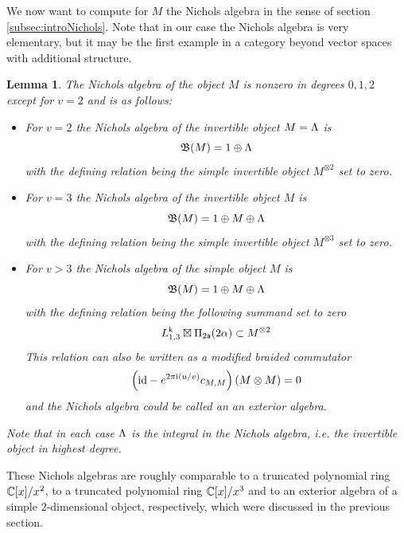 \documentclass[a4paper, reqno]{amsart}
\newtheorem{lemma}[theorem]{Lemma}
\theoremstyle{introTheorems}
\newcommand\id{\textup{id}}
\renewcommand{\1}{\mathbbold{1}}
\begin{document}
We now want to compute for $M$ the Nichols algebra in the sense of section \ref{subsec:introNichols}. Note that in our case the Nichols algebra is very elementary, but it may be the first example in a category beyond vector spaces with additional structure. 

\begin{lemma}\label{lm_Nichols}
The Nichols algebra of the object $M$ is nonzero in degrees $0,1,2$ except for $v=2$ and is as follows:
\begin{itemize}
\item For $v=2$ the Nichols algebra of the invertible object $M=\Lambda$ is
$$\mathfrak{B}(M)=1\oplus \Lambda$$
with the defining relation being the simple invertible object $M^{\otimes 2}$ set to zero.\\

\item For $v=3$ the Nichols algebra of the invertible object $M$ is
$$\mathfrak{B}(M)=1\oplus M\oplus \Lambda$$
with the defining relation being the simple invertible object $M^{\otimes 3}$ set to zero.\\

\item For $v>3$ the Nichols algebra of the simple object $M$ is 
$$\mathfrak{B}(M)=1\oplus M\oplus \Lambda$$
with the defining relation being the following summand
set to zero 
$$L^{\mathsf{k}}_{1,3}\boxtimes\Pi_{2\mathsf{a}}(2\alpha)\subset M^{\otimes 2}$$
This relation can also be written as a modified braided commutator 
\[\left(\id-e^{2\pi\i(u/v)}c_{M,M}\right)(M\otimes M)=0\]
and the Nichols algebra could be called an an exterior algebra. 
\end{itemize}
Note that in each case $\Lambda$ is the integral in the Nichols algebra, i.e. the invertible object in highest degree.
\end{lemma}
These Nichols algebras are roughly comparable to a truncated polynomial ring $\mathbb{C}[x]/x^2$, to a truncated polynomial ring $\mathbb{C}[x]/x^3$ and to an exterior algebra of a simple $2$-dimensional object, respectively, which were discussed in the previous section. 
\end{document}
